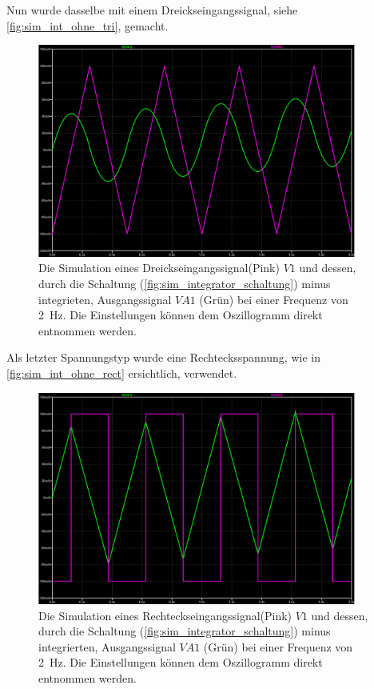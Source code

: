 \documentclass[12pt,english,ngerman]{scrartcl}
\begin{document}
Nun wurde dasselbe mit einem Dreickseingangssignal, siehe
\autoref{fig:sim_int_ohne_tri}, gemacht.

\begin{figure}[H]
  \centering
    \includegraphics[width=\linewidth, height=7cm]{./figures/integrator/sim/umkehr_int/dreieck_100mv_t500ms.png}
  \caption{Die Simulation eines Dreickseingangssignal(Pink) $V1$ und dessen, durch
  die Schaltung (\autoref{fig:sim_integrator_schaltung}) minus integrieten,
Ausgangssignal $VA1$ (Grün) bei einer Frequenz von \SI{2}{\hertz}. Die Einstellungen
können dem Oszillogramm direkt entnommen werden.}
  \label{fig:sim_int_ohne_tri}
\end{figure}

Als letzter Spannungstyp wurde eine Rechtecksspannung, wie in \autoref{fig:sim_int_ohne_rect}
ersichtlich, verwendet.
\begin{figure}[H]
  \centering
    \includegraphics[width=\linewidth, height=7cm]{./figures/integrator/sim/umkehr_int/rechteck_100mv_t500ms.png}
  \caption{Die Simulation eines Rechteckseingangssignal(Pink) $V1$ und dessen, durch
  die Schaltung (\autoref{fig:sim_integrator_schaltung}) minus integrierten,
Ausgangssignal $VA1$ (Grün) bei einer Frequenz von \SI{2}{\hertz}. Die Einstellungen
können dem Oszillogramm direkt entnommen werden.}
  \label{fig:sim_int_ohne_rect}
\end{figure}
\end{document}
